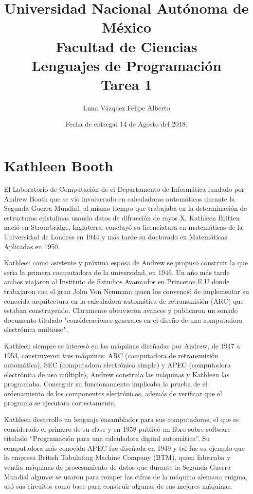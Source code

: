\documentclass{article}
\title{Universidad Nacional Aut\'onoma de M\'exico\\
Facultad de Ciencias\\
Lenguajes de Programación \\
Tarea 1}
\author{Luna Vázquez Felipe Alberto}
\date{Fecha de entrega: 14 de Agosto del 2018.}
\begin{document}
\maketitle

\section{Kathleen Booth}
El Laboratorio de Computaci\'{o}n de el Departamento de Inform\'{a}tica fundado por Andrew Booth que se vio involucrado en calculadoras autom\'{a}ticas durante la Segunda Guerra Mundial, al mismo tiempo que trabajaba en la determinaci\'{o}n de estructuras cristalinas usando datos de difracci\'{o}n de rayos X. Kathleen Britten 
naci\'{o} en Strourbridge, Inglaterra, concluy\'{o}  su licenciatura en matem\'{a}ticas de la Universidad de Londres en 1944 y m\'{a}s tarde su doctorado en Matem\'{a}ticas Aplicadas en 1950. \newline

Kathleen como asistente y pr\'{o}xima esposa de Andrew se propuso construir la que ser\'{\i}a la primera computadora de la universidad, en 1946. Un a\~{n}o m\'{a}s tarde ambos viajaron al Instituto de Estudios Avanzados en Princeton,E.U donde trabajaron con el gran John Von Neumann quien los convenci\'{o} de implementar su conocida arquitectura en la calculadora autom\'{a}tica de retransmisi\'{o}n (ARC) que estaban construyendo. Claramente obtuvieron avances y publicaron un sonado documento titulado  "consideraciones generales en el dise\~{n}o de una computadora electr\'{o}nica multiuso". \newline

Kathleen siempre se interes\'{o} en las m\'{a}quinas dise\~{n}adas por Andrew, de 1947 a 1953, construyeron tres m\'{a}quinas: ARC (computadora de retransmisi\'{o}n autom\'{a}tica), SEC (computadora electr\'{o}nica simple) y APEC (computadora electr\'{o}nica de uso m\'{u}ltiple), Andrew constru\'{\i}a las m\'{a}quinas y Kathleen las programaba. Conseguir su funcionamiento implicaba la prueba de el ordenamiento de los componentes electr\'{o}nicos, adem\'{a}s de verificar que el programa se ejecutara correctamente. \newline

Kathleen desarrollo un lenguaje ensamblador para sus computadoras, el que es considerado el primero de su clase y en 1958 public\'{o} un libro sobre software titulado \textquotedblleft{}Programaci\'{o}n para una calculadora digital autom\'{a}tica\textquotedblright{}.  Su computadora m\'{a}s conocida APEC fue dise\~{n}ada en 1949 y tal fue su ejemplo que la empresa British Tabulating Machine Company (BTM), quien fabricaba y vend\'{\i}a m\'{a}quinas de procesamiento de datos que durante la Segunda Guerra Mundial algunas se usaron para romper las cifras de la m\'{a}quina alemana enigma, us\'{o} sus circuitos como base para construir algunas de sus mejores m\'{a}quinas. \newline
\end{document}
